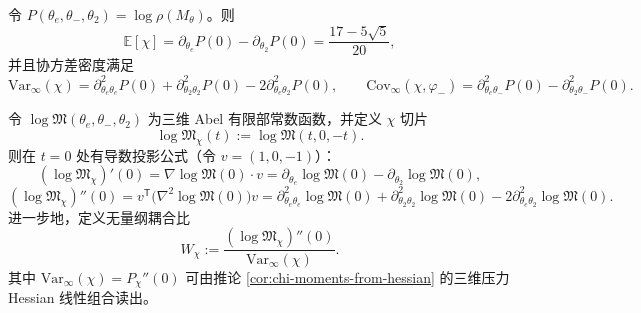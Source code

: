 \begin{corollary}\label{cor:chi-moments-from-hessian}
令 $P(\theta_e,\theta_-,\theta_2)=\log\rho(M_\theta)$。则
\[
\mathbb{E}[\chi]=\partial_{\theta_e}P(0)-\partial_{\theta_2}P(0)=\frac{17-5\sqrt5}{20},
\]
并且协方差密度满足
\[
\mathrm{Var}_\infty(\chi)=\partial_{\theta_e\theta_e}^2P(0)+\partial_{\theta_2\theta_2}^2P(0)-2\partial_{\theta_e\theta_2}^2P(0),
\qquad
\mathrm{Cov}_\infty(\chi,\varphi_-)=\partial_{\theta_e\theta_-}^2P(0)-\partial_{\theta_2\theta_-}^2P(0).
\]
\end{corollary}

\begin{corollary}\label{cor:chi-slice-logm-derivatives-and-W}
令 \(\log\mathfrak{M}(\theta_e,\theta_-,\theta_2)\) 为三维 Abel 有限部常数函数，并定义 \(\chi\) 切片
$$
\log\mathfrak{M}_\chi(t):=\log\mathfrak{M}(t,0,-t).
$$
则在 \(t=0\) 处有导数投影公式（令 \(v=(1,0,-1)\)）：
$$
(\log\mathfrak{M}_\chi)'(0)
=\nabla\log\mathfrak{M}(0)\cdot v
=\partial_{\theta_e}\log\mathfrak{M}(0)-\partial_{\theta_2}\log\mathfrak{M}(0),
$$
$$
(\log\mathfrak{M}_\chi)''(0)
=v^{\mathsf T}\bigl(\nabla^2\log\mathfrak{M}(0)\bigr)v
=\partial_{\theta_e\theta_e}^2\log\mathfrak{M}(0)+\partial_{\theta_2\theta_2}^2\log\mathfrak{M}(0)-2\partial_{\theta_e\theta_2}^2\log\mathfrak{M}(0).
$$
进一步地，定义无量纲耦合比
$$
W_\chi:=\frac{(\log\mathfrak{M}_\chi)''(0)}{\mathrm{Var}_\infty(\chi)}.
$$
其中 \(\mathrm{Var}_\infty(\chi)=P_\chi''(0)\) 可由推论 \ref{cor:chi-moments-from-hessian} 的三维压力 Hessian 线性组合读出。
\end{corollary}



